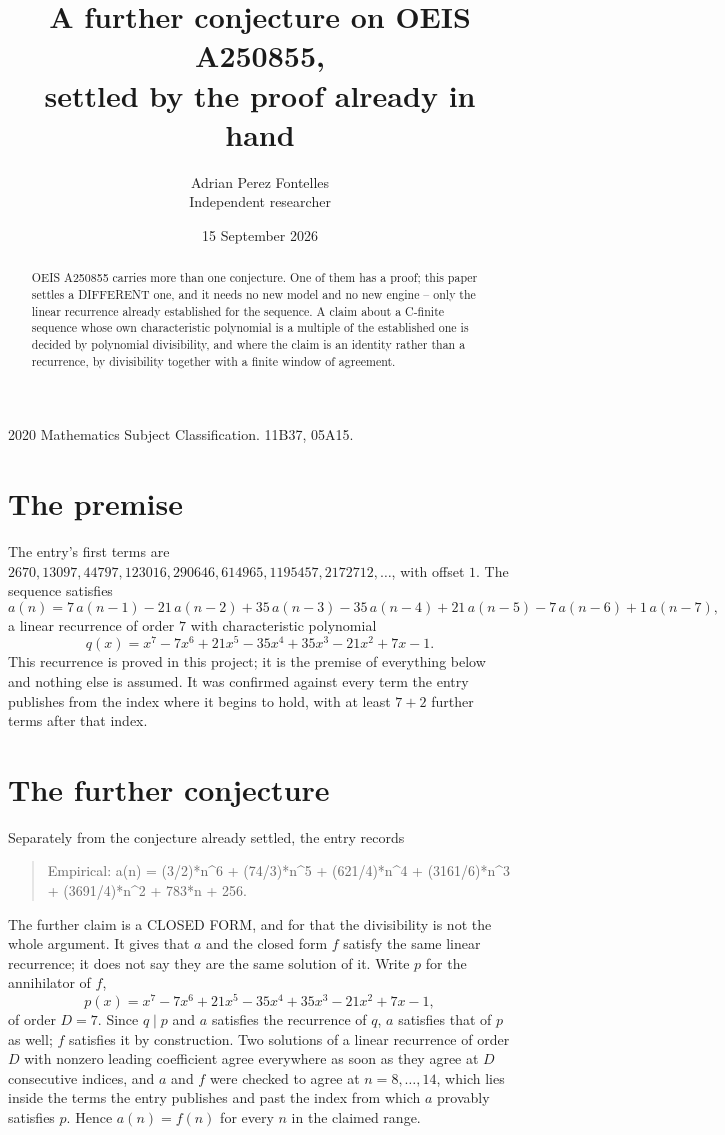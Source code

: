\documentclass[11pt,a4paper]{article}
\title{A further conjecture on OEIS A250855,\\ \large settled by the proof already in hand}
\author{Adrian Perez Fontelles\\ \small Independent researcher}
\date{15 September 2026}
\theoremstyle{plain}
\theoremstyle{definition}
\begin{document}
\maketitle

\begin{abstract}
OEIS A250855 carries more than one conjecture. One of them has a proof; this paper settles a
DIFFERENT one, and it needs no new model and no new engine -- only the linear recurrence already
established for the sequence. A claim about a C-finite sequence whose own characteristic
polynomial is a multiple of the established one is decided by polynomial divisibility, and where
the claim is an identity rather than a recurrence, by divisibility together with a finite window
of agreement.
\end{abstract}

\noindent\small 2020 Mathematics Subject Classification. 11B37, 05A15.\normalsize

\section{The premise}

The entry's first terms are $2670, 13097, 44797, 123016, 290646, 614965, 1195457, 2172712,\dots$, with offset $1$. The sequence satisfies
\[
  a(n)=7\,a(n-1) - 21\,a(n-2) + 35\,a(n-3) - 35\,a(n-4) + 21\,a(n-5) - 7\,a(n-6) + 1\,a(n-7) ,
\]
a linear recurrence of order $7$ with characteristic polynomial
\[
  q(x)=x^{7} - 7 x^{6} + 21 x^{5} - 35 x^{4} + 35 x^{3} - 21 x^{2} + 7 x - 1 .
\]
This recurrence is proved in this project; it is the premise of everything below and nothing else is assumed.
It was confirmed against every term the entry publishes from the index where it begins to hold,
with at least $7+2$ further terms after that index.

\section{The further conjecture}

Separately from the conjecture already settled, the entry records

\begin{quote}\raggedright Empirical: a(n) = (3/2)*n\^{}6 + (74/3)*n\^{}5 + (621/4)*n\^{}4 + (3161/6)*n\^{}3 + (3691/4)*n\^{}2 + 783*n + 256.\end{quote}

The further claim is a CLOSED FORM, and for that the divisibility is not the whole argument. It
gives that $a$ and the closed form $f$ satisfy the same linear recurrence; it does not say they
are the same solution of it. Write $p$ for the annihilator of $f$,
\[
  p(x)=x^{7} - 7 x^{6} + 21 x^{5} - 35 x^{4} + 35 x^{3} - 21 x^{2} + 7 x - 1 ,
\]
of order $D=7$. Since $q\mid p$ and $a$ satisfies the recurrence of $q$, $a$ satisfies that of
$p$ as well; $f$ satisfies it by construction. Two solutions of a linear recurrence of order $D$
with nonzero leading coefficient agree everywhere as soon as they agree at $D$ consecutive
indices, and $a$ and $f$ were checked to agree at $n=8,\dots,14$,
which lies inside the terms the entry publishes and past the index from which $a$ provably
satisfies $p$. Hence $a(n)=f(n)$ for every $n$ in the claimed range.
\end{document}

